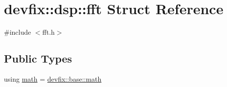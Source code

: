 \hypertarget{structdevfix_1_1dsp_1_1fft}{}\section{devfix\+:\+:dsp\+:\+:fft Struct Reference}
\label{structdevfix_1_1dsp_1_1fft}


{\ttfamily \#include $<$fft.\+h$>$}

\subsection*{Public Types}
\begin{DoxyCompactItemize}
\item 
using \hyperlink{structdevfix_1_1dsp_1_1fft_a466499f45d4ae1240f5ba7e8c44a4691}{math} = \hyperlink{structdevfix_1_1base_1_1math}{devfix\+::base\+::math}
\end{DoxyCompactItemize}
